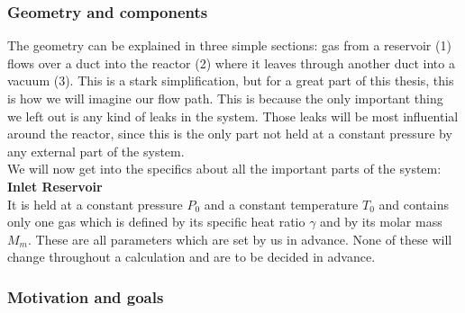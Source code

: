 \subsubsection*{Geometry and components}

The geometry can be explained in three simple sections: gas from a reservoir (1) flows over a duct into the reactor (2) where it leaves through another duct into a vacuum (3). This is a stark simplification, but for a great part of this thesis, this is how we will imagine our flow path. This is because the only important thing we left out is any kind of leaks in the system. Those leaks will be most influential around the reactor, since this is the only part not held at a constant pressure by any external part of the system.\\
We will now get into the specifics about all the important parts of the system:\\
\textbf{Inlet Reservoir}\\
It is held at a constant pressure \(P_0\) and a constant temperature \(T_0\) and contains only one gas which is defined by its specific heat ratio \(\gamma\) and by its molar mass \(M_m\). These are all parameters which are set by us in advance. None of these will change throughout a calculation and are to be decided in advance.

\subsubsection*{Motivation and goals}
